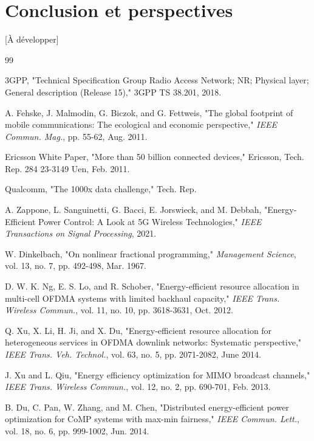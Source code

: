 \documentclass[conference]{IEEEtran}
\begin{document}
\section{Conclusion et perspectives}

[À développer]

\begin{thebibliography}{99}

 3GPP, "Technical Specification Group Radio Access Network; NR; Physical layer; General description (Release 15)," 3GPP TS 38.201, 2018.

 A. Fehske, J. Malmodin, G. Biczok, and G. Fettweis, "The global footprint of mobile communications: The ecological and economic perspective," \textit{IEEE Commun. Mag.}, pp. 55-62, Aug. 2011.

 Ericsson White Paper, "More than 50 billion connected devices," Ericsson, Tech. Rep. 284 23-3149 Uen, Feb. 2011.

 Qualcomm, "The 1000x data challenge," Tech. Rep.

 A. Zappone, L. Sanguinetti, G. Bacci, E. Jorswieck, and M. Debbah, "Energy-Efficient Power Control: A Look at 5G Wireless Technologies," \textit{IEEE Transactions on Signal Processing}, 2021.

 W. Dinkelbach, "On nonlinear fractional programming," \textit{Management Science}, vol. 13, no. 7, pp. 492-498, Mar. 1967.

 D. W. K. Ng, E. S. Lo, and R. Schober, "Energy-efficient resource allocation in multi-cell OFDMA systems with limited backhaul capacity," \textit{IEEE Trans. Wireless Commun.}, vol. 11, no. 10, pp. 3618-3631, Oct. 2012.

 Q. Xu, X. Li, H. Ji, and X. Du, "Energy-efficient resource allocation for heterogeneous services in OFDMA downlink networks: Systematic perspective," \textit{IEEE Trans. Veh. Technol.}, vol. 63, no. 5, pp. 2071-2082, June 2014.

 J. Xu and L. Qiu, "Energy efficiency optimization for MIMO broadcast channels," \textit{IEEE Trans. Wireless Commun.}, vol. 12, no. 2, pp. 690-701, Feb. 2013.

 B. Du, C. Pan, W. Zhang, and M. Chen, "Distributed energy-efficient power optimization for CoMP systems with max-min fairness," \textit{IEEE Commun. Lett.}, vol. 18, no. 6, pp. 999-1002, Jun. 2014.


\end{thebibliography}
\end{document}
